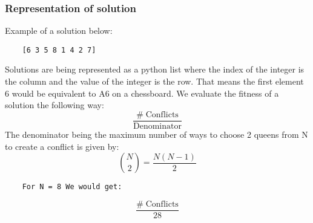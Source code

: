 \documentclass{scrartcl}
\begin{document}
\subsubsection{Representation of solution}
Example of a solution below:
\begin{verbatim}
    [6 3 5 8 1 4 2 7]
\end{verbatim}
Solutions are being represented as a python list where the index of the integer is the column and the value of the integer is the row. That means the first element 6 would be equivalent to A6 on a chessboard. We evaluate the fitness of a solution the following way:
\begin{equation}
    \frac{\text{\#}\; \text{Conflicts}}{\text{Denominator}}
\end{equation}
The denominator being the maximum number of ways to choose 2 queens from N to create a conflict is given by:
\begin{equation}
    \binom{N}{2} = \frac{N(N-1)}{2}
\end{equation}
\begin{verbatim}
    For N = 8 We would get:
\end{verbatim}
\begin{equation}
    \frac{\text{\#}\; \text{Conflicts}}{28}
\end{equation}
\end{document}
